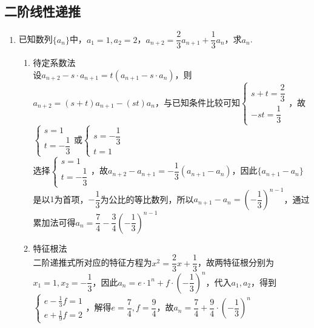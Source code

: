 \subsection*{二阶线性递推}
\begin{enumerate}
    \item 已知数列$\{a_n\}$中，$a_1 = 1, a_2 = 2$，$a_{n+2} = \dfrac{2}{3}a_{n+1}+\dfrac{1}{3}a_n$，求$a_n$.
    \begin{jieda}
        \begin{enumerate}
            \item 待定系数法 \\
            设$a_{n+2} - s \cdot a_{n+1} = t(a_{n+1} - s\cdot a_n)$，则$a_{n+2} = (s+t)a_{n+1} - (st)a_n$，与已知条件比较可知$\left\{\begin{array}{l}
                 s+t = \dfrac{2}{3} \\
                 -st = \dfrac{1}{3}
            \end{array}\right.$，故$\left\{\begin{array}{l}
                 s = 1 \\
                 t = -\dfrac{1}{3}
            \end{array}\right.$或$\left\{\begin{array}{l}
                 s = -\dfrac{1}{3} \\
                 t = 1
            \end{array}\right.$ \\
            选择$\left\{\begin{array}{l}
                 s = 1 \\
                 t = -\dfrac{1}{3}
            \end{array}\right.$，故$a_{n+2} - a_{n+1} = -\dfrac{1}{3}(a_{n+1} - a_n)$，因此$\{a_{n+1}-a_n\}$是以$1$为首项，$-\dfrac{1}{3}$为公比的等比数列，所以$a_{n+1} - a_n = \left(-\dfrac{1}{3}\right)^{n-1}$，通过累加法可得$a_n = \dfrac{7}{4} - \dfrac{3}{4}\left(-\dfrac{1}{3}\right)^{n-1}$
            \item 特征根法 \\
            二阶递推式所对应的特征方程为$x^2 = \dfrac{2}{3}x+\dfrac{1}{3}$，故两特征根分别为$x_1 = 1, x_2 = -\dfrac{1}{3}$，因此$a_n = e \cdot 1^n + f \cdot \left(-\dfrac{1}{3}\right)^n$，代入$a_1, a_2$，得到$\left\{\begin{array}{l}
                 e - \frac{1}{3}f = 1 \\
                 e + \frac{1}{9}f = 2
            \end{array}\right.$，解得$e = \dfrac{7}{4}, f = \dfrac{9}{4}$，故$a_n = \dfrac{7}{4} + \dfrac{9}{4} \cdot \left(-\dfrac{1}{3}\right)^n$


\end{enumerate}
\end{jieda}
\end{enumerate}
